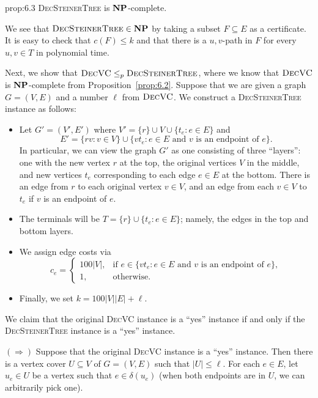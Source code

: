 \begin{prop}{prop:6.3}
    \textsc{DecSteinerTree} is $\mathbf{NP}$-complete.
\end{prop}\vspace{-0.25cm}
\begin{pf}
    We see that $\textsc{DecSteinerTree} \in \mathbf{NP}$ by taking a subset 
    $F \subseteq E$ as a certificate. It is easy to check that $c(F) \leq k$
    and that there is a $u, v$-path in $F$ for every $u, v \in T$ in 
    polynomial time. 

    Next, we show that $\textsc{DecVC} \leq_p \textsc{DecSteinerTree}$, 
    where we know that $\textsc{DecVC}$ is $\mathbf{NP}$-complete from 
    Proposition~\ref{prop:6.2}. Suppose that we are given a graph 
    $G = (V, E)$ and a number $\ell$ from $\textsc{DecVC}$. We 
    construct a \textsc{DecSteinerTree} instance as follows: 
    \begin{itemize}
        \item Let $G' = (V', E')$ where $V' = \{r\} \cup V \cup \{t_e : 
        e \in E\}$ and 
        \[ E' = \{rv : v \in V\} \cup \{vt_e : e \in E \text{ and $v$ 
        is an endpoint of $e$}\}. \]
        In particular, we can view the graph $G'$ as one consisting of three 
        ``layers'': one with the new vertex $r$ at the top, the original 
        vertices $V$ in the middle, and new vertices $t_e$ corresponding to 
        each edge $e \in E$ at the bottom. There is an edge from $r$ to 
        each original vertex $v \in V$, and an edge from each $v \in V$ 
        to $t_e$ if $v$ is an endpoint of $e$. 
        \item The terminals will be $T = \{r\} \cup \{t_e : e \in E\}$; namely, 
        the edges in the top and bottom layers.
        \item We assign edge costs via 
        \[ c_e = \begin{cases}
            100|V|, & \text{if } e \in \{vt_e : e \in E \text{ and $v$ 
            is an endpoint of $e$}\}, \\ 
            1, & \text{otherwise.}
        \end{cases} \]
        \item Finally, we set $k = 100|V||E| + \ell$. 
    \end{itemize}\newpage 
    We claim that the original \textsc{DecVC} instance is a ``yes'' instance 
    if and only if the \textsc{DecSteinerTree} instance is a 
    ``yes'' instance. 

    $(\Rightarrow)$ Suppose that the original \textsc{DecVC} instance is a 
    ``yes'' instance. Then there is a vertex cover $U \subseteq V$ 
    of $G = (V, E)$ such that $|U| \leq \ell$. For each $e \in E$, let 
    $u_e \in U$ be a vertex such that $e \in \delta(u_e)$ (when both 
    endpoints are in $U$, we can arbitrarily pick one).


\end{pf}
